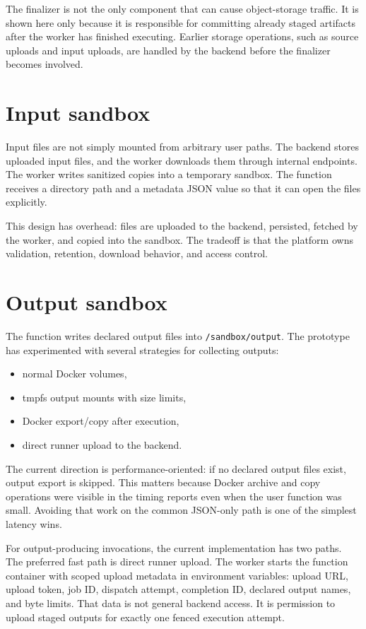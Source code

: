 \documentclass[12pt,a4paper]{report}
\newcommand{\file}[1]{\texttt{#1}}
\begin{document}
The finalizer is not the only component that can cause object-storage traffic.
It is shown here only because it is responsible for committing already staged
artifacts after the worker has finished executing. Earlier storage operations,
such as source uploads and input uploads, are handled by the backend before the
finalizer becomes involved.

\section{Input sandbox}

Input files are not simply mounted from arbitrary user paths. The backend
stores uploaded input files, and the worker downloads them through internal
endpoints. The worker writes sanitized copies into a temporary sandbox. The
function receives a directory path and a metadata JSON value so that it can
open the files explicitly.

This design has overhead: files are uploaded to the backend, persisted, fetched
by the worker, and copied into the sandbox. The tradeoff is that the platform
owns validation, retention, download behavior, and access control.

\section{Output sandbox}

The function writes declared output files into \file{/sandbox/output}. The
prototype has experimented with several strategies for collecting outputs:

\begin{itemize}[leftmargin=1.2cm]
  \item normal Docker volumes,
  \item tmpfs output mounts with size limits,
  \item Docker export/copy after execution,
  \item direct runner upload to the backend.
\end{itemize}

The current direction is performance-oriented: if no declared output files
exist, output export is skipped. This matters because Docker archive and copy
operations were visible in the timing reports even when the user function was
small. Avoiding that work on the common JSON-only path is one of the simplest
latency wins.

For output-producing invocations, the current implementation has two paths. The
preferred fast path is direct runner upload. The worker starts the function
container with scoped upload metadata in environment variables: upload URL,
upload token, job ID, dispatch attempt, completion ID, declared output names,
and byte limits. That data is not general backend access. It is permission to
upload staged outputs for exactly one fenced execution attempt.
\end{document}
